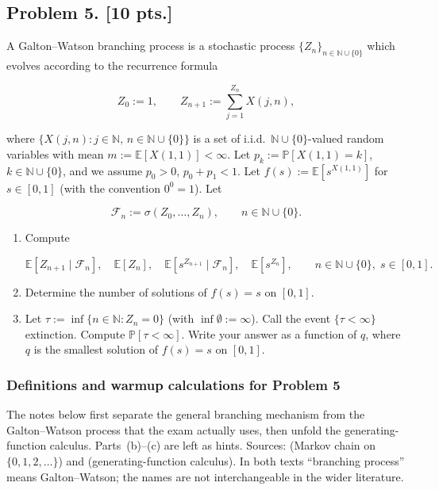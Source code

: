 \documentclass[11pt,a4paper]{article}
\begin{document}
\subsection{Problem 5. [10 pts.]}
A Galton--Watson branching process is a stochastic process \( \{Z_n\}_{n \in \mathbb{N} \cup \{0\}} \) which evolves according to the recurrence formula

\[
Z_0 := 1, \qquad Z_{n+1} := \sum_{j=1}^{Z_n} X(j, n),
\]

where \( \{X(j, n) : j \in \mathbb{N},\, n \in \mathbb{N} \cup \{0\}\} \) is a set of i.i.d.\ \( \mathbb{N} \cup \{0\} \)-valued random variables with mean \( m := \mathbb{E}[X(1, 1)] < \infty \). Let \( p_k := \mathbb{P}[X(1, 1) = k] \), \( k \in \mathbb{N} \cup \{0\} \), and we assume \( p_0 > 0 \), \( p_0 + p_1 < 1 \). Let \( f(s) := \mathbb{E}[s^{X(1,1)}] \) for \( s \in [0, 1] \) (with the convention \( 0^0 = 1 \)). Let

\[
\mathcal{F}_n := \sigma(Z_0, \dots, Z_n), \qquad n \in \mathbb{N} \cup \{0\}.
\]

\begin{enumerate}[label=(\alph*)]
    \item Compute

    \[
    \mathbb{E}[Z_{n+1} \mid \mathcal{F}_n],\quad
    \mathbb{E}[Z_n],\quad
    \mathbb{E}[s^{Z_{n+1}} \mid \mathcal{F}_n],\quad
    \mathbb{E}[s^{Z_n}], \qquad n \in \mathbb{N} \cup \{0\},\; s \in [0, 1].
    \]
    \item Determine the number of solutions of \( f(s) = s \) on \( [0, 1] \).
    \item Let \( \tau := \inf\{n \in \mathbb{N} : Z_n = 0\} \) (with \( \inf \emptyset := \infty \)). Call the event \( \{\tau < \infty\} \) extinction. Compute \( \mathbb{P}[\tau < \infty] \). Write your answer as a function of \( q \), where \( q \) is the smallest solution of \( f(s) = s \) on \( [0, 1] \).
\end{enumerate}

\setcounter{section}{5}
\setcounter{definition}{0}

\subsubsection{Definitions and warmup calculations for Problem 5}

The notes below first separate the general branching mechanism from the Galton--Watson process that the exam actually uses, then unfold the generating-function calculus. Parts~(b)--(c) are left as hints. Sources: \citep[Exercise~5.11, Proposition~5.6, Remark~5.2]{brzezniak1999} (Markov chain on \(\{0,1,2,\dots\}\)) and \citep[\S5.3.4]{durrett2010} (generating-function calculus). In both texts ``branching process'' means Galton--Watson; the names are not interchangeable in the wider literature.
\end{document}
